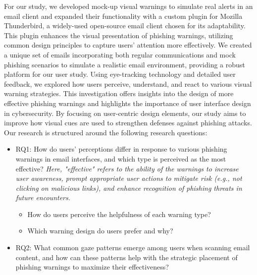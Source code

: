 \documentclass[
  a4paper,  %
  twoside,  %
  bibliography=totoc,
  headsepline,
  cleardoublepage=empty,
  parskip=half,
  draft=false
]{scrbook}
\begin{document}
For our study, we developed mock-up visual warnings to simulate real alerts in an email client and expanded their functionality with a custom plugin for Mozilla Thunderbird, a widely-used open-source email client chosen for its adaptability. This plugin enhances the visual presentation of phishing warnings, utilizing common design principles to capture users' attention more effectively. \newline
We created a unique set of emails incorporating both regular communications and mock phishing scenarios to simulate a realistic email environment, providing a robust platform for our user study. Using eye-tracking technology and detailed user feedback, we explored how users perceive, understand, and react to various visual warning strategies. This investigation offers insights into the design of more effective phishing warnings and highlights the importance of user interface design in cybersecurity. By focusing on user-centric design elements, our study aims to improve how visual cues are used to strengthen defenses against phishing attacks. Our research is structured around the following research questions:

\begin{itemize}
    \item RQ1: How do users' perceptions differ in response to various phishing warnings in email interfaces, and which type is perceived as the most effective? \textit{Here, "effective" refers to the ability of the warnings to increase user awareness, prompt appropriate user actions to mitigate risk (e.g., not clicking on malicious links), and enhance recognition of phishing threats in future encounters.}
        \begin{itemize}
            \item How do users perceive the helpfulness of each warning type?
        \end{itemize}
        \begin{itemize}
            \item Which warning design do users prefer and why?
        \end{itemize}
    \item RQ2: What common gaze patterns emerge among users when scanning email content, and how can these patterns help with the strategic placement of phishing warnings to maximize their effectiveness?
\end{itemize}
\end{document}
